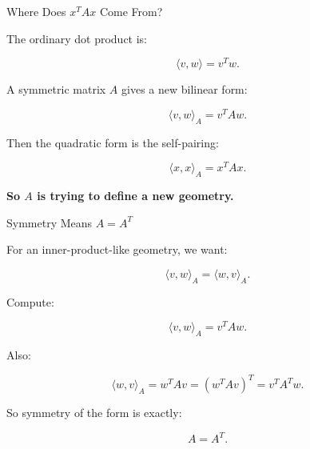 \documentclass[10pt]{beamer}
\theoremstyle{definition}
\newcommand{\x}[1]{\alert{\textbf{#1}}}
\begin{document}
\begin{frame}{Where Does $x^TAx$ Come From?}

The ordinary dot product is:

$$
\langle v,w\rangle=v^Tw.
$$

\vfill

A symmetric matrix $A$ gives a new bilinear form:

$$
\boxed{\langle v,w\rangle_A=v^TAw.}
$$

\vfill

Then the quadratic form is the self-pairing:

$$
\boxed{\langle x,x\rangle_A=x^TAx.}
$$

\vfill

\begin{center}
\x{So $A$ is trying to define a new geometry.}
\end{center}

\end{frame}


\begin{frame}{Symmetry Means $A=A^T$}

For an inner-product-like geometry, we want:

$$
\langle v,w\rangle_A=\langle w,v\rangle_A.
$$

\vfill

Compute:

$$
\langle v,w\rangle_A=v^TAw.
$$

\vfill

Also:

$$
\langle w,v\rangle_A=w^TAv=(w^TAv)^T=v^TA^Tw.
$$

\vfill

So symmetry of the form is exactly:

$$
\boxed{A=A^T.}
$$

\end{frame}
\end{document}
